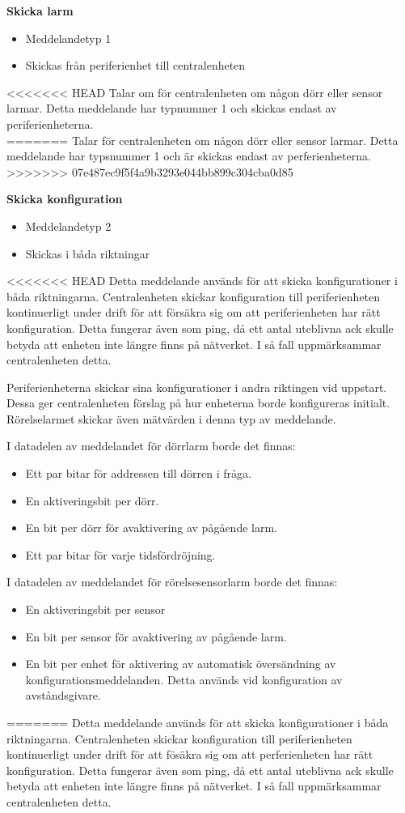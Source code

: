 \textbf{Skicka larm}
\begin{itemize}
    \item Meddelandetyp 1
    \item Skickas från periferienhet till centralenheten
\end{itemize}
<<<<<<< HEAD
Talar om för centralenheten om någon dörr eller sensor larmar. Detta meddelande har typnummer 1 och skickas endast av periferienheterna. \\
=======
Talar för centralenheten om någon dörr eller sensor larmar.
Detta meddelande har typsnummer 1 och är skickas endast av perferienheterna. \\
>>>>>>> 07e487ec9f5f4a9b3293e044bb899c304cba0d85


\textbf{Skicka konfiguration}
\begin{itemize}
    \item Meddelandetyp 2
    \item Skickas i båda riktningar
\end{itemize}
<<<<<<< HEAD
Detta meddelande används för att skicka konfigurationer i båda riktningarna. Centralenheten skickar konfiguration till periferienheten kontinuerligt under drift för att försäkra sig om att periferienheten har rätt konfiguration. Detta fungerar även som ping, då ett antal uteblivna ack skulle betyda att enheten inte längre finns på nätverket. I så fall uppmärksammar centralenheten detta.

Periferienheterna skickar sina konfigurationer i andra riktingen vid uppstart. Dessa ger centralenheten förslag på hur enheterna borde konfigureras initialt. Rörelselarmet skickar även mätvärden i denna typ av meddelande.

I datadelen av meddelandet för dörrlarm borde det finnas:
\begin{itemize}
	\item Ett par bitar för addressen till dörren i fråga.
	\item En aktiveringsbit per dörr.
	\item En bit per dörr för avaktivering av pågående larm.
	\item Ett par bitar för varje tidsfördröjning.
\end{itemize}

I datadelen av meddelandet för rörelsesensorlarm borde det finnas:
\begin{itemize}
	\item En aktiveringsbit per sensor
	\item En bit per sensor för avaktivering av pågående larm.
	\item En bit per enhet för aktivering av automatisk översändning av konfigurationsmeddelanden. Detta används vid konfiguration av avståndsgivare.
\end{itemize}
=======
Detta meddelande används för att skicka konfigurationer i båda riktningarna.
Centralenheten skickar konfiguration till periferienheten kontinuerligt under drift för att fösäkra sig om att perferienheten har rätt konfiguration.
Detta fungerar även som ping, då ett antal uteblivna ack skulle betyda att enheten inte längre finns på nätverket.
I så fall uppmärksammar centralenheten detta.


